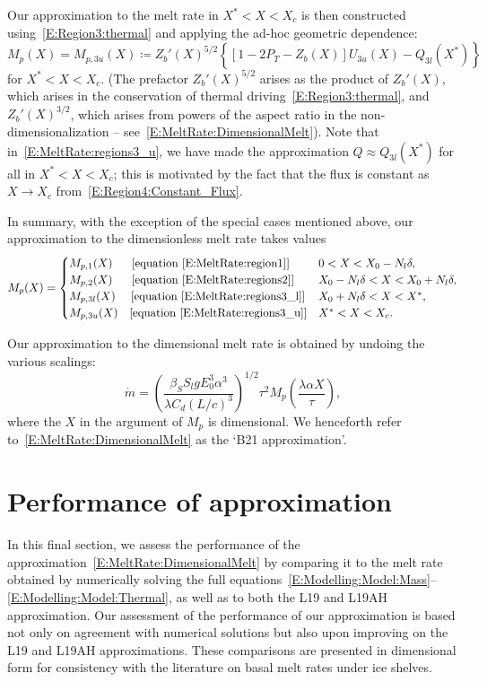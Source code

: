 \documentclass[openacc]{rsproca_new}%
\newcommand{\lt}{\delta} %
\newcommand{\Pt}{\textit{P}_T}
\begin{document}
Our approximation to the melt rate in $X^* < X <X_c$ is then constructed using~\eqref{E:Region3:thermal} and applying the ad-hoc geometric dependence:
\begin{equation}\label{E:MeltRate:regions3_u}
M_p(X) = M_{p,3u}(X) \coloneqq Z_b'(X)^{5/2}\left\{ \left[1  - 2\Pt -  Z_b(X)\right] U_{3u}(X) - Q_{3l}(X^*) \right\}
\end{equation}
for $X^* < X < X_c$. (The prefactor $Z_b'(X)^{5/2}$ arises as the product of $Z_b'(X)$, which arises in the conservation of thermal driving~\eqref{E:Region3:thermal}, and $Z_b'(X)^{3/2}$, which arises from powers of the aspect ratio in the non-dimensionalization -- see~\eqref{E:MeltRate:DimensionalMelt}). Note that in~\eqref{E:MeltRate:regions3_u}, we have made the approximation $Q \approx Q_{3l}(X^*)$ for all in $X^* < X < X_c$; this is motivated by the fact that the flux is constant as $X \to X_c$ from~\eqref{E:Region4:Constant_Flux}.

In summary, with the exception of the special cases mentioned above, our approximation to the dimensionless melt rate takes values
\begin{equation}\label{E:MeltRate:AllRegions}
M_{p}(X) = \begin{cases} 
M_{p,1}(X) \text{~~\quad [equation~\eqref{E:MeltRate:region1}]}  & 0 < X < X_0 - N_l \lt,\\
M_{p,2}(X) \text{~~\quad [equation~\eqref{E:MeltRate:regions2}]} & X_0 - N_l \lt < X < X_0 + N_l \lt,\\
M_{p,3l}(X) \text{~\quad [equation~\eqref{E:MeltRate:regions3_l}]} & X_0 + N_l \lt < X < X^*,\\
M_{p,3u}(X) \text{\quad [equation~\eqref{E:MeltRate:regions3_u}]} & X^* < X < X_c.
\end{cases}
\end{equation}


Our approximation to the dimensional melt rate is obtained by undoing the various scalings:
\begin{equation}\label{E:MeltRate:DimensionalMelt}
\dot{m} =\left(\frac{\beta_S S_l g  E_0^3 \alpha^3}{\lambda C_d (L/c)^3}\right)^{1/2} \tau^2  M_p\left(\frac{\lambda \alpha X}{\tau}\right),
\end{equation}
where the $X$ in the argument of $M_p$ is dimensional. We henceforth refer to~\eqref{E:MeltRate:DimensionalMelt} as the `B21 approximation'.


\section{Performance of approximation}\label{S:Numerics}
In this final section, we assess the performance of the approximation~\eqref{E:MeltRate:DimensionalMelt} by comparing it to the melt rate obtained by numerically solving the full equations~\eqref{E:Modelling:Model:Mass}--\eqref{E:Modelling:Model:Thermal}, as well as to both the L19 and L19AH approximation. Our assessment of the performance of our approximation is based not only on agreement with numerical solutions but also upon improving on the L19 and L19AH approximations. These comparisons are presented in dimensional form for consistency with the literature on basal melt rates under ice shelves.
\end{document}
